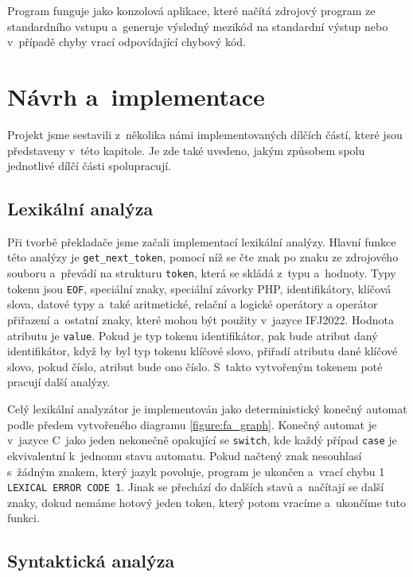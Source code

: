 \documentclass[a4paper, 11pt]{article}
\begin{document}
	Program funguje jako konzolová aplikace, které načítá zdrojový program ze standardního vstupu a~generuje
	výsledný mezikód na standardní výstup nebo v~případě chyby vrací odpovídající chybový kód.



	\section{Návrh a~implementace}

	Projekt jsme sestavili z~několika námi implementovaných dílčích částí, které jsou představeny v~této kapitole.
	Je zde také uvedeno, jakým způsobem spolu jednotlivé dílčí části spolupracují.


	\subsection{Lexikální analýza}

	Při tvorbě překladače jsme začali implementací lexikální analýzy. Hlavní funkce této analýzy je \texttt{get\_next\_token},
	pomocí níž se čte znak po znaku ze zdrojového souboru a~převádí na strukturu \texttt{token}, která se skládá z~typu a~hodnoty.
	Typy tokenu jsou \texttt{EOF}, speciální znaky, speciální závorky PHP, identifikátory, klíčová slova, datové typy a~také aritmetické, relační a logické operátory a operátor přiřazení a~ostatní znaky, které mohou být použity v~jazyce IFJ2022.
	Hodnota atributu je
	\texttt{value}. Pokud je typ tokenu identifikátor, pak bude atribut daný identifikátor,
	když by byl typ tokenu klíčové slovo, přiřadí atributu dané klíčové slovo, pokud číslo, atribut bude ono číslo. S~takto vytvořeným tokenem poté pracují další analýzy.

	Celý lexikální analyzátor je implementován jako deterministický konečný automat podle předem vytvořeného diagramu
	\ref{figure:fa_graph}. Konečný automat je v~jazyce C~jako jeden nekonečně opakující se \texttt{switch}, kde každý případ
	\texttt{case} je ekvivalentní k~jednomu stavu automatu. Pokud načtený znak nesouhlasí s~žádným znakem, který jazyk povoluje,
	program je ukončen a~vrací chybu 1 \texttt{LEXICAL ERROR CODE 1}. Jinak se přechází do dalších stavů a~načítají se další znaky, dokud nemáme hotový jeden
	token, který potom vracíme a~ukončíme tuto funkci.


	\subsection{Syntaktická analýza}
\end{document}
